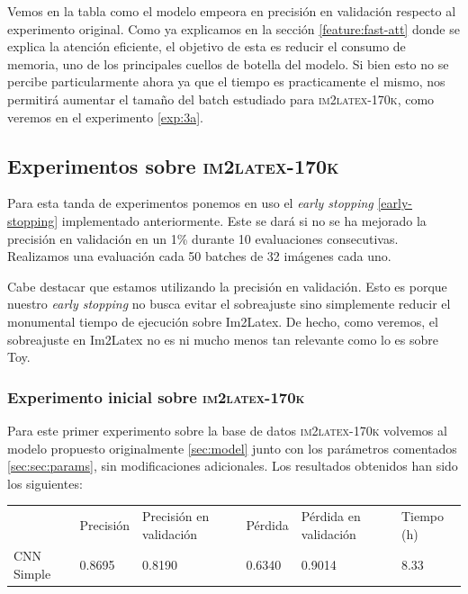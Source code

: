 \documentclass[a4paper, 20pt, dvipsnames]{article}
\begin{document}
Vemos en la tabla como el modelo empeora en precisión en validación respecto al
experimento original. Como ya explicamos en la sección \ref{feature:fast-att}
donde se explica la atención eficiente, el objetivo de esta es reducir el
consumo de memoria, uno de los principales cuellos de botella del modelo. Si
bien esto no se percibe particularmente ahora ya que el tiempo es practicamente
el mismo, nos permitirá aumentar el tamaño del batch estudiado para
\textsc{im2latex-170k}, como veremos en el experimento \ref{exp:3a}.


\subsection{Experimentos sobre \textsc{im2latex-170k}}

Para esta tanda de experimentos ponemos en uso el \emph{early stopping} \ref{early-stopping} implementado anteriormente. Este se dará si no se 
ha mejorado la precisión en validación en un 1\% durante 10 evaluaciones
consecutivas. Realizamos una evaluación cada 50 batches de 32 imágenes
cada uno.

Cabe destacar que estamos utilizando la precisión en validación. Esto es porque nuestro
\emph{early stopping} no busca evitar el sobreajuste sino simplemente reducir el
monumental tiempo de ejecución sobre Im2Latex. De hecho, como veremos, el sobreajuste en
Im2Latex no es ni mucho menos tan relevante como lo es sobre Toy.

\subsubsection{Experimento inicial sobre \textsc{im2latex-170k}}
\label{exp:1}

Para este primer experimento sobre la base de datos \textsc{im2latex-170k}
volvemos al modelo propuesto originalmente \ref{sec:model} junto con los
parámetros comentados \ref{sec:sec:params}, sin modificaciones adicionales. Los
resultados obtenidos han sido los siguientes:

\begin{table}[H]
	\centering
	\begin{tabular}{llllll}
		& Precisión & Precisión en validación & Pérdida & Pérdida en validación & Tiempo (h) \\ \cline{2-6} 
		CNN Simple & 0.8695    & 0.8190                  & 0.6340  & 0.9014                & 8.33      
	\end{tabular}
\end{table}
\end{document}
